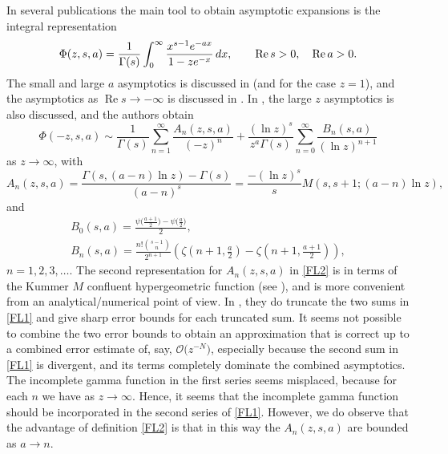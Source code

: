 \documentclass[11pt]{article}
\numberwithin{equation}{section}
\numberwithin{equation}{section}
\def\expe{{\rm e}}
\def\id{\,{\rm d}}
\def\bigO{{\mathcal O}}
\begin{document}
In several publications the main tool to obtain asymptotic expansions is the integral
representation
\begin{equation}\label{int}
 \Phi(z,s,a)=\frac1{\Gamma(s)}\int_0^\infty
 \frac{x^{s-1}\expe^{-ax}}{1-z\expe^{-x}}\id x,\qquad \operatorname{Re} s>0,\quad\operatorname{Re} a>0.
\end{equation}
The small and large $a$ asymptotics is discussed in \cite{Cai2019,Ferreira2004,paris2016stokes} (and \cite{Nemes2017} for the case $z=1$), and
the asymptotics as $\operatorname{Re} s\to -\infty$ is discussed in \cite{Navas2013}.
In \cite{Ferreira2004}, the large $z$ asymptotics is also discussed, and the authors obtain
\begin{equation}\label{FL1}
 \Phi(-z,s,a)\sim\frac1{\Gamma(s)}\sum_{n=1}^\infty
 \frac{A_n(z,s,a)}{(-z)^{n}}+\frac{(\ln z)^s}{z^a\Gamma(s)}
 \sum_{n=0}^\infty\frac{B_n(s,a)}{(\ln z)^{n+1}}
\end{equation}
as $z\to\infty$, with
\begin{equation}\label{FL2}
 A_n(z,s,a)=\frac{\Gamma(s,(a-n)\ln z)-\Gamma(s)}{(a-n)^s}
 =\frac{-(\ln z)^s}{s}M(s,s+1;(a-n)\ln z),
\end{equation}
and
\begin{gather*}%
 B_0(s,a)=\frac{\psi\bigl(\frac{a+1}2\bigr)-
 \psi\bigl(\frac{a}2\bigr)}2,\\
 B_n(s,a)=\frac{n!{s-1\choose n}}{2^{n+1}}\left( \zeta\left(n+1,\frac{a}2\right)-
 \zeta\left(n+1,\frac{a+1}2\right)\right),
\end{gather*}
$n=1,2,3,\ldots$. The second representation for $A_n(z,s,a)$ in \eqref{FL2} is in terms
of the Kummer $M$ confluent hypergeometric function
(see \cite[\href{https://dlmf.nist.gov/13.2.E2}{equation~(13.2.2)}]{NIST:DLMF}),
and is more convenient from an analytical/numerical point of view.
In \cite{Ferreira2004}, they do truncate the two sums in \eqref{FL1} and give sharp error bounds
for each truncated sum. It seems not possible to combine the two error bounds
to obtain an approximation
that is correct up to a combined error estimate of, say, $\bigO\bigl(z^{-N}\bigr)$,
especially because the second sum in \eqref{FL1} is divergent, and its terms completely
dominate the combined asymptotics. The incomplete gamma function in the first series seems
misplaced, because for each $n$ we have
\smash{$\frac{\Gamma(s,(a-n)\ln z)}{(a-n)^s (-z)^{n}}
=\bigO\bigl(\frac{(\ln z)^s}{z^a}\bigr)$} as $z\to\infty$.
Hence, it seems that the incomplete gamma function should be incorporated in the second
series of \eqref{FL1}. However, we do observe that the advantage of definition
\eqref{FL2} is that in this way the $A_n(z,s,a)$ are bounded as $a\to n$.
\end{document}
